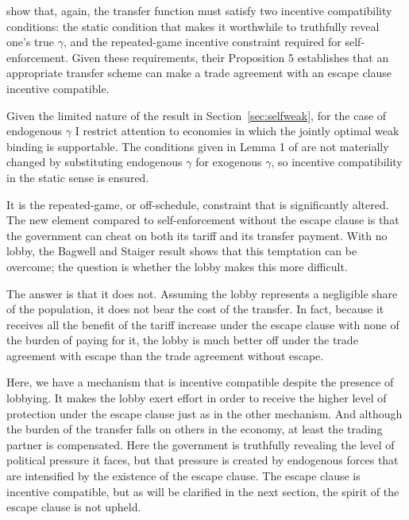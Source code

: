 \documentclass[12pt]{article}
\newcommand{\ga}{\gamma}
\begin{document}
\Textcite{bs2005} show that, again, the transfer function must satisfy two incentive compatibility conditions: the static condition that makes it worthwhile to truthfully reveal one's true $\ga$, and the repeated-game incentive constraint required for self-enforcement. Given these requirements, their Proposition 5 establishes that an appropriate transfer scheme can make a trade agreement with an escape clause incentive compatible.

Given the limited nature of the result in Section~\ref{sec:selfweak}, for the case of endogenous $\ga$ I restrict attention to economies in which the jointly optimal weak binding is supportable. The conditions given in Lemma 1 of \Textcite{bs2005} are not materially changed by substituting endogenous $\ga$ for exogenous $\ga$, so incentive compatibility in the static sense is ensured.

It is the repeated-game, or off-schedule, constraint that is significantly altered. The new element compared to self-enforcement without the escape clause is that the government can cheat on both its tariff and its transfer payment. With no lobby, the Bagwell and Staiger result shows that this temptation can be overcome; the question is whether the lobby makes this more difficult.

The answer is that it does not. Assuming the lobby represents a negligible share of the population, it does not bear the cost of the transfer. In fact, because it receives all the benefit of the tariff increase under the escape clause with none of the burden of paying for it, the lobby is much better off under the trade agreement with escape than the trade agreement without escape.


Here, we have a mechanism that is incentive compatible despite the presence of lobbying. It makes the lobby exert effort in order to receive the higher level of protection under the escape clause just as in the other mechanism. And although the burden of the transfer falls on others in the economy, at least the trading partner is compensated. Here the government is truthfully revealing the level of political pressure it faces, but that pressure is created by endogenous forces that are intensified by the existence of the escape clause. The escape clause is incentive compatible, but as will be clarified in the next section, the spirit of the escape clause is not upheld.
\end{document}
